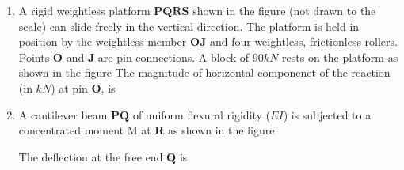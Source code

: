 \documentclass[journal,12pt,onecolumn]{IEEEtran}
\theoremstyle{remark}
\begin{document}
\begin{enumerate}
\begin{center}


\end{center}
\begin{enumerate}
\end{enumerate}
\item A rigid weightless platform $\textbf{PQRS}$ shown in the figure (not drawn to the scale)  can slide freely in the vertical direction. The platform is held in position by the weightless member $\textbf{OJ}$ and four weightless, frictionless rollers. Points $\textbf{O}$ and $ \textbf{J} $ are pin connections. A block of $90 kN $ rests on the platform as shown in the figure
The magnitude of horizontal componenet of the reaction (in $kN$) at pin $\textbf{O}$, is 



\begin{enumerate}
\end{enumerate}

\item A cantilever beam $\textbf{PQ}$ of uniform flexural rigidity ($EI$) is subjected to a concentrated moment M at $\textbf{R}$ as shown in the figure





The deflection at the free end $\textbf{Q}$ is
\begin{enumerate}
\end{enumerate}


\end{enumerate}
\end{document}
